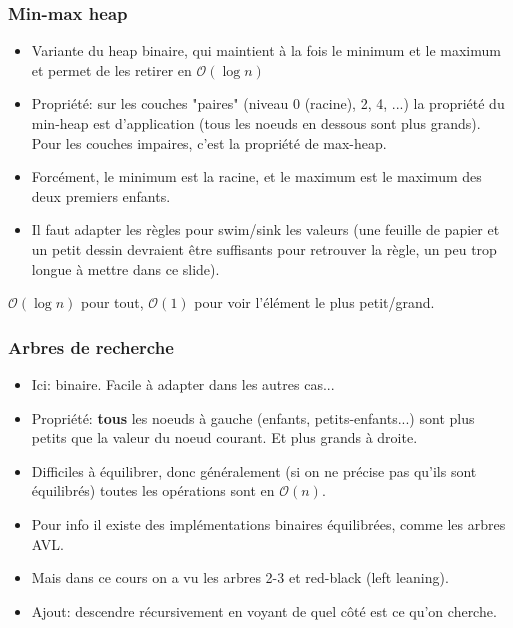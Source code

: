 \documentclass[8pt,aspectratio=169]{beamer}
\begin{document}
\begin{frame}
\frametitle{Min-max heap}
\begin{itemize}
	\item Variante du heap binaire, qui maintient à la fois le minimum et le maximum et permet de les retirer en $\mathcal{O}(\log n)$
	\item Propriété: sur les couches "paires" (niveau 0 (racine), 2, 4, ...) la propriété du min-heap est d'application (tous les noeuds en dessous sont plus grands). Pour les couches impaires, c'est la propriété de max-heap.
	\item Forcément, le minimum est la racine, et le maximum est le maximum des deux premiers enfants.
	\item Il faut adapter les règles pour swim/sink les valeurs (une feuille de papier et un petit dessin devraient être suffisants pour retrouver la règle, un peu trop longue à mettre dans ce slide).
\end{itemize}
$\mathcal{O}(\log n)$ pour tout, $\mathcal{O}(1)$ pour voir l'élément le plus petit/grand.
\end{frame}
\begin{frame}
\frametitle{Arbres de recherche}
\begin{itemize}
	\item Ici: binaire. Facile à adapter dans les autres cas...
	\item Propriété: \textbf{tous} les noeuds à gauche (enfants, petits-enfants...) sont plus petits que la valeur du noeud courant. Et plus grands à droite.
	\item Difficiles à équilibrer, donc généralement (si on ne précise pas qu'ils sont équilibrés) toutes les opérations sont en $\mathcal{O}(n)$.
	\item Pour info il existe des implémentations binaires équilibrées, comme les arbres AVL.
	\item Mais dans ce cours on a vu les arbres 2-3 et red-black (left leaning).
	\item Ajout: descendre récursivement en voyant de quel côté est ce qu'on cherche.
\end{itemize}
\end{frame}
\end{document}
